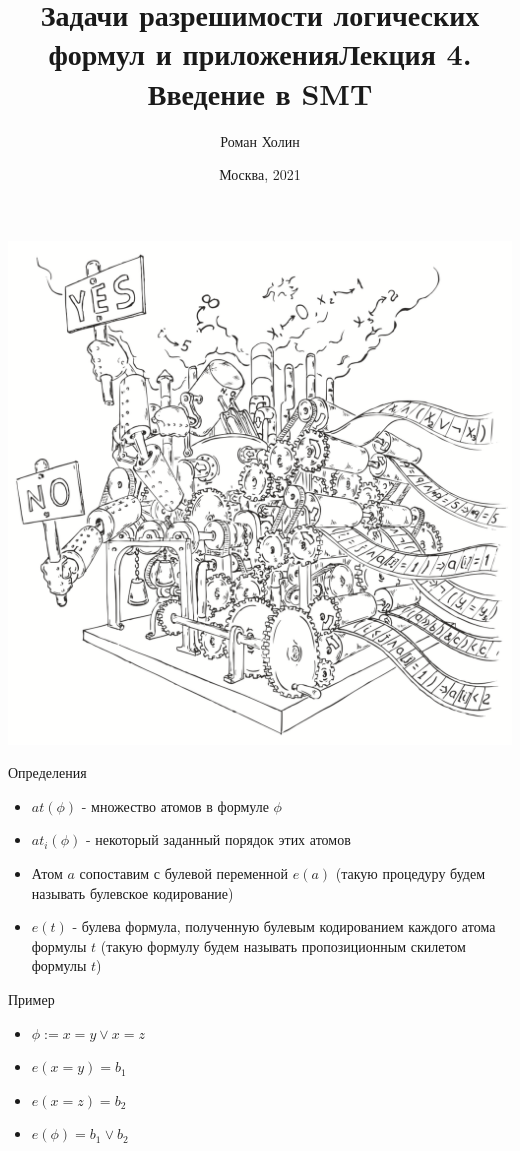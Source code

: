 \documentclass{beamer}
\begin{document}
\title{Задачи разрешимости логических формул и приложения\newline Лекция 4. Введение в SMT}
\author{Роман Холин}
\date{Москва, 2021}

\begin{frame}
\includegraphics[scale=0.5]{../decision-procedure.png}
\end{frame}

\frame{\titlepage}

\begin{frame}{Определения}
\begin{itemize}
\item $at(\phi)$ - множество атомов в формуле $\phi$
\item $at_i(\phi)$ - некоторый заданный порядок этих атомов
\item Атом $a$ сопоставим с булевой переменной $e(a)$ (такую процедуру будем называть булевское кодирование)
\item $e(t)$ - булева формула, полученную булевым кодированием каждого атома формулы $t$ (такую формулу будем называть
пропозиционным скилетом формулы $t$)
\end{itemize}
\end{frame}

\begin{frame}{Пример}
\begin{itemize}
\item $\phi := x = y \vee x = z$
\item $e(x = y) = b_1$
\item $e(x = z) = b_2$
\item $e(\phi) = b_1 \vee b_2$
\end{itemize}
\end{frame}
\end{document}
